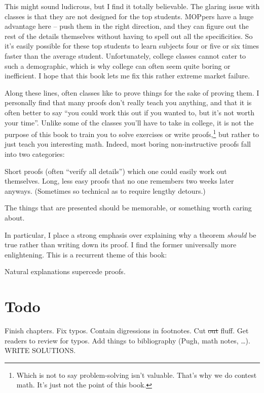 This might sound ludicrous, but I find it totally believable.
The glaring issue with classes is that they are not designed for the top students.
MOPpers have a huge advantage here -- push them in the right direction,
and they can figure out the rest of the details themselves
without having to spell out all the specificities.
So it's easily possible for these top students to learn subjects
four or five or six times faster than the average student.
Unfortunately, college classes cannot cater to such a demographic,
which is why college can often seem quite boring or inefficient.
I hope that this book lets me fix this rather extreme market failure.

Along these lines, often classes like to prove things for the sake of proving them.
I personally find that many proofs don't really teach you anything,
and that it is often better to say ``you could work this out if you wanted to, but it's not worth your time''.
Unlike some of the classes you'll have to take in college,
it is not the purpose of this book to train you to solve exercises or write proofs,\footnote{%
	Which is not to say problem-solving isn't valuable.
	That's why we do contest math.
	It's just not the point of this book.}
but rather to just teach you interesting math.
Indeed, most boring non-instructive proofs fall into two categories:
\begin{enumerate}[(i)]
	\ii Short proofs (often ``verify all details'') which one could easily work out themselves.
	\ii Long, less easy proofs that no one remembers two weeks later anyways.
	(Sometimes so technical as to require lengthy detours.)
\end{enumerate}
The things that are presented should be memorable, or something worth caring about.

In particular, I place a strong emphasis over explaining why a theorem \emph{should}
be true rather than writing down its proof.
I find the former universally more enlightening.
This is a recurrent theme of this book:
\begin{moral}
Natural explanations supercede proofs.
\end{moral}

\section*{Todo}
Finish chapters.
Fix typos.
Contain digressions in footnotes.
Cut \sout{out} fluff.
Get readers to review for typos.
Add things to bibliography (Pugh, math notes, \dots).
WRITE SOLUTIONS.

